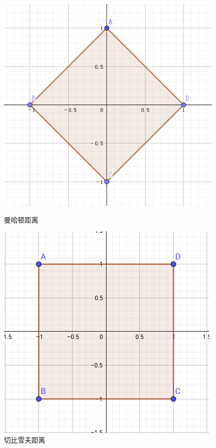 \documentclass[openbib]{article}
\begin{document}
\begin{figure}[htbp]
	\centering
	\begin{minipage}[t]{0.48\textwidth}
		\centering
		\includegraphics[scale=0.35]{曼哈顿距离.png}
		\caption{曼哈顿距离}
		\label{b}
	\end{minipage}
	\begin{minipage}[t]{0.48\textwidth}
		\centering
		\includegraphics[scale=0.35]{切比雪夫距离.png}
		\caption{切比雪夫距离}
		\label{c}
	\end{minipage}
\end{figure}
\end{document}
